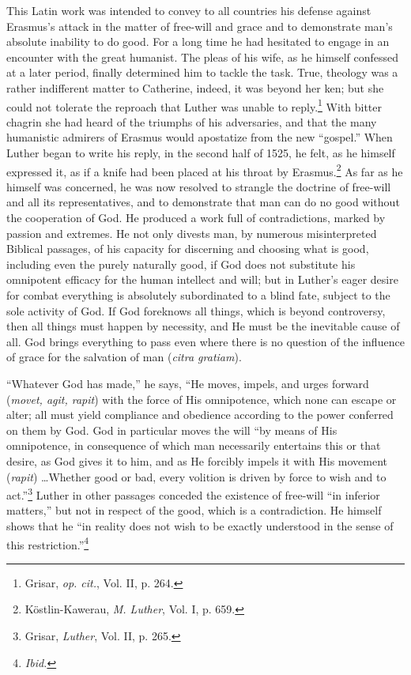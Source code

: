 This Latin work was intended to convey to all countries his
defense against Erasmus’s attack in the matter of free-will and
grace and to demonstrate man’s absolute inability to do good. For
a long time he had hesitated to engage in an encounter with the
great humanist. The pleas of his wife, as he himself confessed at a
later period, finally determined him to tackle the task. True, theology
was a rather indifferent matter to Catherine, indeed, it was beyond
her ken; but she could not tolerate the reproach that Luther was
unable to reply.\footnote{Grisar, \textit{op. cit.}, Vol. II, p. 264. }
With bitter chagrin she had heard of the triumphs
of his adversaries, and that the many humanistic admirers of Erasmus
would apostatize from the new “gospel.” When Luther began to
write his reply, in the second half of 1525, he felt, as he himself
expressed it, as if a knife had been placed at his throat by Erasmus.\footnote
{Köstlin-Kawerau, \textit{M. Luther}, Vol. I, p. 659. }
As far as he himself was concerned, he was now resolved to strangle
the doctrine of free-will and all its representatives, and to demonstrate
that man can do no good without the cooperation of God.
He produced a work full of contradictions, marked by passion and
extremes. He not only divests man, by numerous misinterpreted Biblical
passages, of his capacity for discerning and choosing what is good, including
even the purely naturally good, if God does not substitute his omnipotent
efficacy for the human intellect and will; but in Luther's eager desire
for combat everything is absolutely subordinated to a blind fate, subject
to the sole activity of God. If God foreknows all things, which is beyond
controversy, then all things must happen by necessity, and He must be
the inevitable cause
of all. God brings everything to pass even where there is no question
of the influence of grace for the salvation of man (\textit{citra gratiam}).

“Whatever God has made,” he says, “He moves, impels, and urges forward
(\textit{movet, agit, rapit}) with the force of His omnipotence, which none can
escape or alter; all must yield compliance and obedience according to the
power conferred on them by God. God in particular moves the will “by means
of His omnipotence, in consequence of which man necessarily entertains this
or that desire, as God gives it to him, and as He forcibly impels it with His
movement (\textit{rapit}) \dots Whether good or bad, every volition is driven by
force to wish and to act.”\footnote{Grisar, \textit{Luther}, Vol. II, p. 265.}
Luther in other passages conceded the existence
of free-will “in inferior matters,” but not in respect of the good, which is a
contradiction. He himself shows that he “in reality does not wish to be
exactly understood in the sense of this restriction.”\footnote{\textit{Ibid.}}


